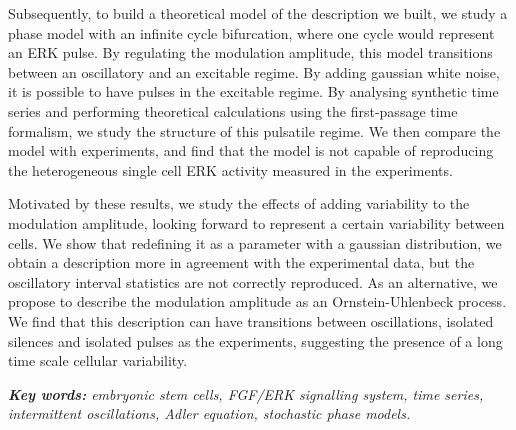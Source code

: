 \documentclass[./main.tex]{subfiles}
\begin{document}
Subsequently, to build a theoretical model of the description we built, we study a phase model with an infinite cycle bifurcation, where one cycle would represent an ERK pulse. By regulating the modulation amplitude, this model transitions between an oscillatory and an excitable regime. By adding gaussian white noise, it is possible to have pulses in the excitable regime. By analysing synthetic time series and performing theoretical calculations using the first-passage time formalism, we study the structure of this pulsatile regime. We then compare the model with experiments, and find that the model is not capable of reproducing the heterogeneous single cell ERK activity measured in the experiments.

Motivated by these results, we study the effects of adding variability to the modulation amplitude, looking forward to represent a certain variability between cells. We show that redefining it as a parameter with a gaussian distribution, we obtain a description more in agreement with the experimental data, but the oscillatory interval statistics are not correctly reproduced. As an alternative, we propose to describe the modulation amplitude as an Ornstein-Uhlenbeck process. We find that this description can have transitions between oscillations, isolated silences and isolated pulses as the experiments, suggesting the presence of a long time scale cellular variability.
\vspace{0.5cm}


\textit{\textbf{Key words:} embryonic stem cells, FGF/ERK signalling system, time series, intermittent oscillations, Adler equation, stochastic phase models.}
\end{document}
